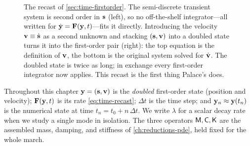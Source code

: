 \begin{figure}[t]
\centering
{}
\caption[The second-order to first-order recast]{The recast of
\cref{sec:time-firstorder}. The semi-discrete transient system is second order in
$\mathbf{s}$ (left), so no off-the-shelf integrator---all written for $\dot{\mathbf{y}} =
\mathbf{F}(\mathbf{y},t)$---fits it directly. Introducing the velocity $\mathbf{v} \equiv \dot{\mathbf{s}}$ as a
second unknown and stacking $(\mathbf{s}, \mathbf{v})$ into a doubled state turns it into the
first-order pair (right): the top equation is the definition of $\mathbf{v}$, the bottom
is the original system solved for $\dot{\mathbf{v}}$. The doubled state is twice as long;
in exchange every first-order integrator now applies. This recast is the first
thing Palace's  does.}
\label{fig:recast}
\end{figure}

\begin{notationbox}
Throughout this chapter $\mathbf{y} = (\mathbf{s}, \mathbf{v})$ is the \emph{doubled} first-order state
(position and velocity); $\mathbf{F}(\mathbf{y}, t)$ is its rate \cref{eq:time-recast}; $\Delta
t$ is the time step; and $\mathbf{y}_n \approx \mathbf{y}(t_n)$ is the numerical state at time
$t_n = t_0 + n\,\Delta t$. We write $\lambda$ for a scalar decay rate when we study
a single mode in isolation. The three operators $\mathsf{M}, \mathsf{C}, \mathsf{K}$ are the
assembled mass, damping, and stiffness of \cref{ch:reductions-pde}, held fixed for
the whole march.
\end{notationbox}

